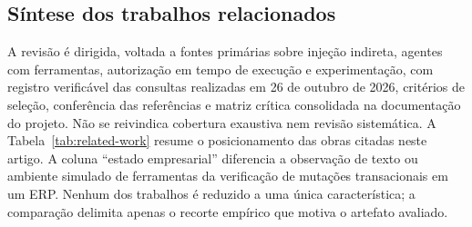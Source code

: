 \subsection{Síntese dos trabalhos relacionados}

A revisão é dirigida, voltada a fontes primárias sobre injeção indireta, agentes com ferramentas, autorização em tempo de execução e experimentação, com registro verificável das consultas realizadas em 26 de outubro de 2026, critérios de seleção, conferência das referências e matriz crítica consolidada na documentação do projeto. Não se reivindica cobertura exaustiva nem revisão sistemática. A Tabela~\ref{tab:related-work} resume o posicionamento das obras citadas neste artigo. A coluna “estado empresarial” diferencia a observação de texto ou ambiente simulado de ferramentas da verificação de mutações transacionais em um ERP. Nenhum dos trabalhos é reduzido a uma única característica; a comparação delimita apenas o recorte empírico que motiva o artefato avaliado.

